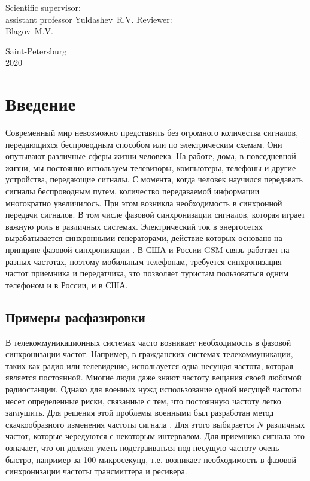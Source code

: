 \documentclass[a4paper,14pt]{article} %
\theoremstyle{cited}
\begin{document}
\hfill \break
\hfill \break
\hfill \break
 
 \small{
\begin{flushright}
Scientific supervisor:\\
assistant professor Yuldashev~R.\:V.
\break \break
\break \break
Reviewer:\\
Blagov~M.\:V.
\end{flushright}
}
\hfill \break
\hfill \break
\hfill \break
\hfill \break
\hfill \break
\hfill \break
\hfill \break
\hfill \break
\hfill \break
\hfill \break
\begin{center} Saint-Petersburg \\
2020 \end{center}
\thispagestyle{empty} %

\pagebreak
\tableofcontents


\newpage
\section{Введение}
Современный мир невозможно представить без огромного количества сигналов, передающихся беспроводным способом или по электрическим схемам. Они опутывают различные сферы жизни человека. На работе, дома, в повседневной жизни, мы постоянно используем телевизоры, компьютеры, телефоны и другие устройства, передающие сигналы. С момента, когда человек научился передавать сигналы беспроводным путем, количество передаваемой информации многократно увеличилось. При этом возникла необходимость в синхронной передачи сигналов. В том числе фазовой синхронизации сигналов, которая играет важную роль в различных системах. Электрический ток в энергосетях вырабатывается синхронными генераторами, действие которых основано на принципе фазовой синхронизации \cite{ilie}. В США и России GSM связь работает на разных частотах, поэтому мобильным телефонам, требуется синхронизация частот приемника и передатчика, это позволяет туристам пользоваться одним телефоном и в России, и в США.

\subsection{Примеры расфазировки}
В телекоммуникационных системах часто возникает необходимость в фазовой синхронизации частот. Например, в гражданских системах телекоммуникации, таких как радио или телевидение, используется одна несущая частота, которая является постоянной. Многие люди даже знают частоту вещания своей любимой радиостанции. Однако для военных нужд использование одной несущей частоты несет определенные риски, связанные с тем, что постоянную частоту легко заглушить. Для решения этой проблемы военными был разработан метод скачкообразного изменения частоты сигнала \cite{ghulam}. Для этого выбирается $N$ различных частот, которые чередуются с некоторым интервалом. Для приемника сигнала это означает, что он должен уметь подстраиваться под несущую частоту очень быстро, например за 100 микросекунд, т.е. возникает необходимость в фазовой синхронизации частоты трансмиттера и ресивера. 
\end{document}
